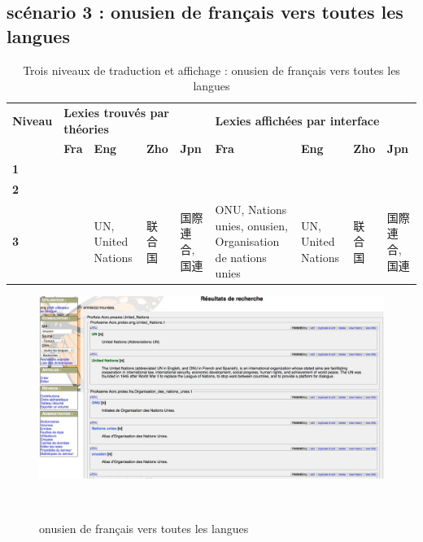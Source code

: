 \documentclass[10pt,a4paper,twoside]{article}
\begin{document}
\begin{itemize}
\subsection{scénario 3 :  onusien de français vers toutes les langues}
\begin{table}[!h]
\centering
	\begin{tabular}{|p{1cm}|p{1.8cm}|p{1cm}|p{1cm}|p{0.5cm}|p{1.8cm}|p{1cm}|p{1cm}|p{1cm}|}
	\hline
	\textbf{Niveau} & \multicolumn{4}{l|}{\textbf{ Lexies trouvés par théories}}&\multicolumn{4}{l|}{\textbf{Lexies affichées par interface}} \\
	\cline{2-9}
	&\textbf{Fra} & \textbf{Eng} & \textbf{Zho} & \textbf{Jpn} & \textbf{Fra} & \textbf{Eng}  & \textbf{Zho} & \textbf{Jpn} \\
	\hline
	\textbf{1} &  &  &  &  &  &  &  &   \\
 	\hline
	\textbf{2} &  &  &  & &  &  &  & \\
	\hline
	\textbf{3} &  & \raggedright UN, United Nations & \raggedright 联合国 &\raggedright 国際連合, 国連 & \raggedright ONU, Nations unies, onusien, Organisation de nations unies  & \raggedright UN, United Nations &  \raggedright 联合国 & 国際連合, 国連 \\
	\hline
	\end{tabular}
\caption{Trois niveaux de traduction et affichage : onusien de français vers toutes les langues}\label{table}
\end{table}
\begin{figure}[htbp] 
\begin{center} 
\includegraphics[width=14cm]{images/scenario3.jpg}
\end{center} 
\caption{onusien de français vers toutes les langues} \label{image} \
\end{figure}


\end{itemize}
\end{document}
